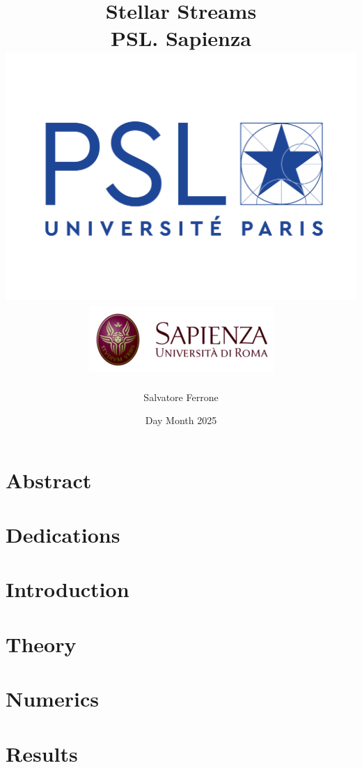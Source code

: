 \documentclass[12pt]{report}
\title{
{Stellar Streams}\\
{\large PSL. Sapienza}\\
{\includegraphics[width=0.5\linewidth]{LOGO-PSL-nov-2017.png}}
{\includegraphics[width=0.6\linewidth]{Uniroma1.png}}
}
\author{Salvatore Ferrone}
\date{Day Month 2025}
\begin{document}
\maketitle

\chapter*{Abstract}


\chapter*{Dedications}

\tableofcontents

\chapter{Introduction}


\chapter{Theory}


\chapter{Numerics}


\chapter{Results}





\end{document}

